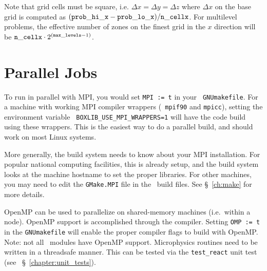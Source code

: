Note that grid cells must be square, i.e. $\Delta x = \Delta y = \Delta z$
where $\Delta x$ on the base grid is computed as $({\tt prob\_hi\_x}
- {\tt prob\_lo\_x})/{\tt n\_cellx}$.  For multilevel problems, the effective
number of zones on the finest grid in the $x$ direction will be
${\tt n\_cellx} \cdot 2^{({\tt max\_levels} -1)}$.



\section{Parallel Jobs}

To run in parallel with MPI, you would set {\tt MPI := t} in your {\tt
GNUmakefile}.  For a machine with working MPI compiler wrappers ({\tt
mpif90} and {\tt mpicc}), setting the environment variable {\tt
BOXLIB\_USE\_MPI\_WRAPPERS=1} will have the code build using these
wrappers.  This is the easiest way to do a parallel build, and should
work on most Linux systems.

More generally, the build system needs to know about your MPI
installation.  For popular national computing facilities, this is
already setup, and the build system looks at the machine hostname to
set the proper libraries.  For other machines, you may need to edit
the {\tt GMake.MPI} file in the \boxlib\ build files.  See
\S~\ref{ch:make} for more details.

OpenMP can be used to parallelize on shared-memory machines (i.e.\
within a node).  OpenMP support is accomplished through the compiler.
Setting {\tt OMP := t} in the {\tt GNUmakefile} will enable the proper
compiler flags to build with OpenMP.  Note: not all \maestro\ modules 
have OpenMP support.  Microphysics routines need to be written in a
threadsafe manner.  This can be tested via the {\tt test\_react} unit
test (see ~\S~\ref{chapter:unit_tests}).

